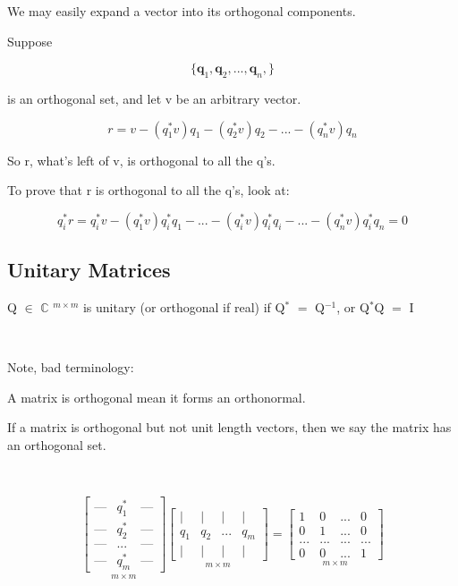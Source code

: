 \documentclass[12pt]{article}
\newcommand{\mt}[1]{\ensuremath{#1}}
\newcommand\ssc[2][\DefaultOpt]{%
  \def\DefaultOpt{#2}%
  \subsection[#1]{#2}%
}
\newcommand{\bc}{\mt{\mathbb{C}} }       %
\newcommand{\mem}{\mt{\in} }
\newcommand{\bk}[1]{\{#1\}}
\newcommand{\eql}{\mt{=} }
\newcommand{\uf}[2]{#1\mt{^{#2}}}
\begin{document}
We may easily expand a vector into its orthogonal components.

Suppose

\begin{displaymath}
  \bk{\textbf{q}_1, \textbf{q}_2, ..., \textbf{q}_n, }
\end{displaymath}

is an orthogonal set, and let v be an arbitrary vector.

\begin{displaymath}
  r = v - (q_1^* v)q_1 - (q_2^* v)q_2 - ... - (q_n^* v)q_n
\end{displaymath}

So r, what's left of v, is orthogonal to all the q's.

To prove that r is orthogonal to all the q's, look at:

\begin{displaymath}
  q_i^* r = q_i^* v - (q^*_1 v) q^*_i q_1 - ... - (q^*_i v) q^*_i q_i - ... - (q^*_n v) q^*_i q_n = 0
\end{displaymath}


\ssc{Unitary Matrices}{

Q \mem \uf{\bc}{m \times m} is unitary (or orthogonal if real) if \uf{Q}{*} \eql \uf{Q}{-1}, or \uf{Q}{*}Q \eql I

}

\

Note, bad terminology:

A matrix is orthogonal mean it forms an orthonormal.

If a matrix is orthogonal but not unit length vectors, then we say the matrix has an orthogonal set.

\

\begin{displaymath}
  \underset{m \times m}{
\begin{bmatrix}
    \text{---} & q_1^* & \text{---} \\
    \text{---} & q_2^* & \text{---}\\
    \text{---} & ... & \text{---}\\
    \text{---} & q_m^* & \text{---}
\end{bmatrix}
} \underset{m \times m}{
\begin{bmatrix}
    \vert & \vert & \vert & \vert \\
    q_1 & q_2 & ... & q_m \\
    \vert & \vert & \vert & \vert
\end{bmatrix}
} = \underset{m \times m}{
\begin{bmatrix}
    1 & 0 & ... & 0 \\
    0 & 1 & ... & 0  \\
    ... & ... & ... & ... \\
    0 & 0 & ... &  1
  \end{bmatrix}
}
\end{displaymath}
\end{document}
